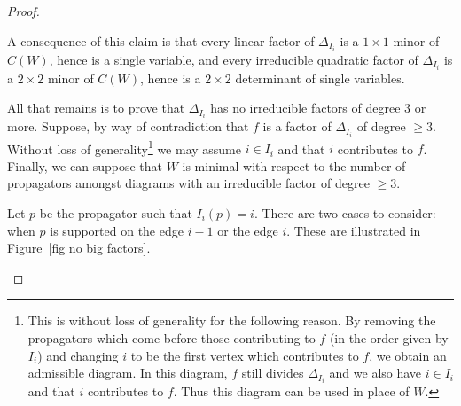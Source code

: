 \documentclass[11pt]{article}
\theoremstyle{remark}
\theoremstyle{definition}
\begin{document}
\begin{proof}
\begin{enumerate}
A consequence of this claim is that every linear factor of $\Delta_{I_i}$ is a $1\times 1$ minor of $C(W)$, hence is a single variable, and every irreducible quadratic factor of $\Delta_{I_i}$ is a $2\times 2$ minor of $C(W)$, hence is a $2\times 2$ determinant of single variables.

All that remains is to prove that $\Delta_{I_i}$ has no irreducible factors of degree 3 or more.  Suppose, by way of contradiction that $f$ is a factor of $\Delta_{I_i}$ of degree $\geq 3$. Without loss of generality\footnote{This is without loss of generality for the following reason.  By removing the propagators which come before those contributing to $f$ (in the order given by $I_i$) and changing $i$ to be the first vertex which contributes to $f$, we obtain an admissible diagram.  In this diagram, $f$ still divides $\Delta_{I_i}$ and we also have $i\in I_i$ and that 
$i$ contributes to $f$.  Thus this diagram can be used in place of $W$.} we may assume $i\in I_i$ and that $i$ contributes to $f$.
Finally, we can suppose that $W$ is minimal with respect to the number of propagators amongst diagrams with an irreducible factor of degree $\geq 3$. 

Let $p$ be the propagator such that $I_i(p) = i$. There are two cases to consider: when $p$ is supported on the edge $i-1$ or the edge $i$.  These are illustrated in Figure~\ref{fig no big factors}.





\end{enumerate}
\end{proof}
\end{document}
